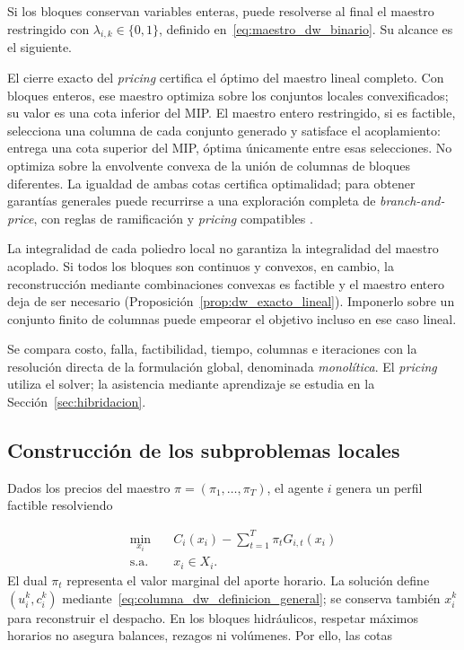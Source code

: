Si los bloques conservan variables enteras, puede resolverse al final el maestro restringido con $\lambda_{i,k}\in\{0,1\}$, definido en~\eqref{eq:maestro_dw_binario}. Su alcance es el siguiente.

\begin{observacion}
\label{obs:maestro_entero_restringido}
El cierre exacto del \emph{pricing} certifica el óptimo del maestro lineal completo.
Con bloques enteros, ese maestro optimiza sobre los conjuntos locales convexificados;
su valor es una cota inferior del MIP. El maestro entero restringido, si es factible,
selecciona una columna de cada conjunto generado y satisface el acoplamiento: entrega
una cota superior del MIP, óptima únicamente entre esas selecciones. No optimiza sobre
la envolvente convexa de la unión de columnas de bloques diferentes.
La igualdad de ambas cotas certifica optimalidad; para obtener garantías generales
puede recurrirse a una exploración completa de \emph{branch-and-price}, con reglas de
ramificación y \emph{pricing} compatibles \cite{DesrosiersLubbecke2005}.

La integralidad de cada poliedro local no garantiza la integralidad del maestro acoplado.
Si todos los bloques son continuos y convexos, en cambio, la reconstrucción mediante
combinaciones convexas es factible y el maestro entero deja de ser necesario
(Proposición~\ref{prop:dw_exacto_lineal}). Imponerlo sobre un conjunto finito de columnas
puede empeorar el objetivo incluso en ese caso lineal.
\end{observacion}

Se compara costo, falla, factibilidad, tiempo, columnas e iteraciones con la resolución directa de la formulación global, denominada \emph{monolítica}. El \emph{pricing} utiliza el solver; la asistencia mediante aprendizaje se estudia en la Sección~\ref{sec:hibridacion}.

\subsection{Construcci\'on de los subproblemas locales}
\label{subsec:construccion_subproblemas_locales}

Dados los precios del maestro $\pi=(\pi_1,\ldots,\pi_T)$, el agente $i$ genera un perfil factible resolviendo

\begin{align}
    \min_{x_i}
    \quad
    &
    C_i(x_i)
    -
    \sum_{t=1}^{T}\pi_t G_{i,t}(x_i)
    \label{eq:pricing_local_obj}
    \\
    \text{s.a.}
    \quad
    &
    x_i\in X_i.
    \label{eq:pricing_local_factibilidad}
\end{align}
El dual $\pi_t$ representa el valor marginal del aporte horario. La solución define $(u_i^k,c_i^k)$ mediante~\eqref{eq:columna_dw_definicion_general}; se conserva también $x_i^k$ para reconstruir el despacho. En los bloques hidráulicos, respetar máximos horarios no asegura balances, rezagos ni volúmenes. Por ello, las cotas

